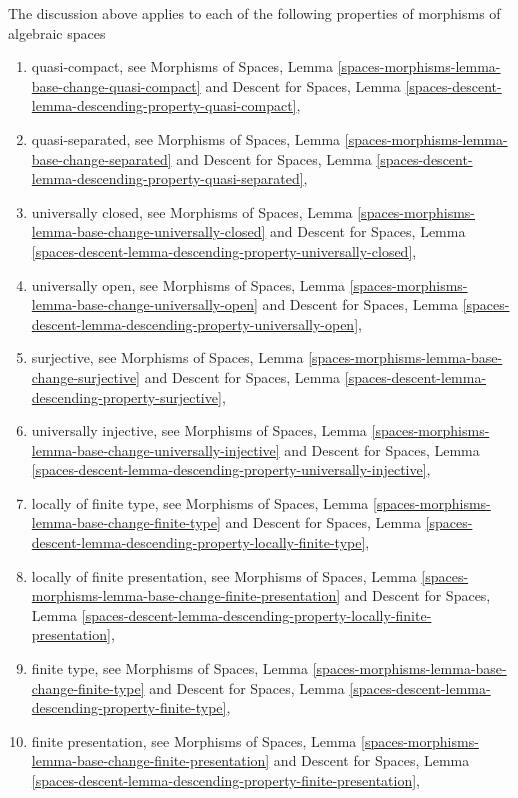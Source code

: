 \medskip\noindent
The discussion above applies to each of the following properties of
morphisms of algebraic spaces
\begin{enumerate}
\item quasi-compact, see
Morphisms of Spaces,
Lemma \ref{spaces-morphisms-lemma-base-change-quasi-compact}
and
Descent for Spaces,
Lemma \ref{spaces-descent-lemma-descending-property-quasi-compact},
\item quasi-separated, see
Morphisms of Spaces,
Lemma \ref{spaces-morphisms-lemma-base-change-separated}
and
Descent for Spaces,
Lemma \ref{spaces-descent-lemma-descending-property-quasi-separated},
\item universally closed, see
Morphisms of Spaces,
Lemma \ref{spaces-morphisms-lemma-base-change-universally-closed}
and
Descent for Spaces,
Lemma \ref{spaces-descent-lemma-descending-property-universally-closed},
\item universally open, see
Morphisms of Spaces,
Lemma \ref{spaces-morphisms-lemma-base-change-universally-open}
and
Descent for Spaces,
Lemma \ref{spaces-descent-lemma-descending-property-universally-open},
\item surjective, see
Morphisms of Spaces,
Lemma \ref{spaces-morphisms-lemma-base-change-surjective}
and
Descent for Spaces,
Lemma \ref{spaces-descent-lemma-descending-property-surjective},
\item universally injective, see
Morphisms of Spaces,
Lemma \ref{spaces-morphisms-lemma-base-change-universally-injective}
and
Descent for Spaces,
Lemma \ref{spaces-descent-lemma-descending-property-universally-injective},
\item locally of finite type, see
Morphisms of Spaces,
Lemma \ref{spaces-morphisms-lemma-base-change-finite-type}
and
Descent for Spaces,
Lemma \ref{spaces-descent-lemma-descending-property-locally-finite-type},
\item locally of finite presentation, see
Morphisms of Spaces,
Lemma \ref{spaces-morphisms-lemma-base-change-finite-presentation}
and
Descent for Spaces, Lemma
\ref{spaces-descent-lemma-descending-property-locally-finite-presentation},
\item finite type, see
Morphisms of Spaces,
Lemma \ref{spaces-morphisms-lemma-base-change-finite-type}
and
Descent for Spaces,
Lemma \ref{spaces-descent-lemma-descending-property-finite-type},
\item finite presentation, see
Morphisms of Spaces,
Lemma \ref{spaces-morphisms-lemma-base-change-finite-presentation}
and
Descent for Spaces, Lemma
\ref{spaces-descent-lemma-descending-property-finite-presentation},

\end{enumerate}
